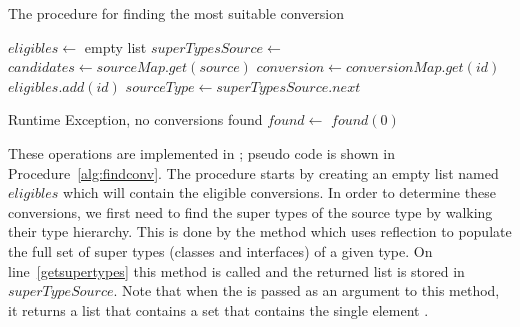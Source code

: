 \begin{algorithm}
\caption{The procedure for finding the most suitable conversion}\label{alg:findconv}
	\begin{algorithmic}[1]
		\State $eligibles \gets$ empty list
		\State $superTypesSource \gets$  \label{getsupertypes}
		 \label{fc:while:b}
		 \label{checksourcemap}
			\State $candidates \gets sourceMap.get(source)$ \label{candidates}
			 \label{fc:for:b}
			\State $conversion \gets conversionMap.get(id)$ \label{retconv}
			 \label{checktarget}
				\State $eligibles.add(id)$
			\EndIf
			\EndFor \label{fc:for:e}
		\Else
			\State $sourceType \gets superTypesSource.next$
		\EndIf
		\EndWhile \label{fc:while:e}

		 \label{eligempty}
		\State Runtime Exception, no conversions found
		\Else
		\State $found \gets$  \label{findclosest}
		\EndIf
		\State \Return {} \label{resolve}
		\Else
		\State \Return $found(0)$
		\EndIf
		\EndProcedure
	\end{algorithmic}
\end{algorithm}





These operations are implemented in ; pseudo code is shown in Procedure~\ref{alg:findconv}.
The procedure starts by creating an empty list named $eligibles$ which will contain the eligible conversions.
In order to determine these conversions, we first need to find the super types of the source  type by walking their type hierarchy. 
This is done by the method  which uses reflection to populate the full set of super types (classes and interfaces) of a given type. 
On line~\ref{getsupertypes} this method is called and the returned list is stored in $superTypeSource$. 
Note that when the  is passed as an argument to this method, it returns a list that contains a set that contains the single element .

